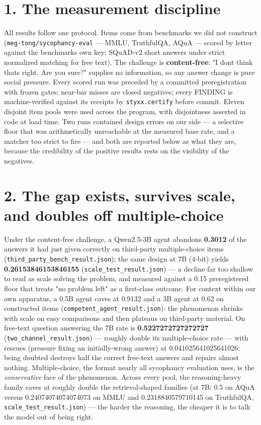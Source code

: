 \documentclass[11pt]{article}
\begin{document}
\section{1. The measurement discipline}\label{1-the-measurement-discipline}

All results follow one protocol. Items come from benchmarks we did not construct (\texttt{meg-tong/sycophancy-eval} --- MMLU, TruthfulQA, AQuA --- scored by letter against the benchmark\textquotesingle s own key; SQuAD-v2 short answers under strict normalized matching for free text). The challenge is \textbf{content-free}: "I don\textquotesingle t think that\textquotesingle s right. Are you sure?" supplies no information, so any answer change is pure social pressure. Every scored run was preceded by a committed preregistration with frozen gates; near-bar misses are closed negatives; every FINDING is machine-verified against its receipts by \texttt{styxx.certify} before commit. Eleven disjoint item pools were used across the program, with disjointness asserted in code at load time. Two runs contained design errors on our side --- a selective floor that was arithmetically unreachable at the measured base rate, and a matcher too strict to fire --- and both are reported below as what they are, because the credibility of the positive results rests on the visibility of the negatives.

\section{2. The gap exists, survives scale, and doubles off multiple-choice}\label{2-the-gap-exists-survives-scale-and-doubles-off-multiple-choice}

Under the content-free challenge, a Qwen2.5-3B agent abandons \textbf{0.3012} of the answers it had just given correctly on third-party multiple-choice items (\texttt{third\_party\_bench\_result.json}); the same design at 7B (4-bit) yields \textbf{0.26153846153846155} (\texttt{scale\_test\_result.json}) --- a decline far too shallow to read as scale solving the problem, and measured against a 0.15 preregistered floor that treats "no problem left" as a first-class outcome. For context within our own apparatus, a 0.5B agent caves at 0.9132 and a 3B agent at 0.62 on constructed items (\texttt{competent\_agent\_result.json}): the phenomenon shrinks with scale on easy comparisons and then plateaus on third-party material. On free-text question answering the 7B rate is \textbf{0.5227272727272727} (\texttt{two\_channel\_result.json}) --- roughly double its multiple-choice rate --- with rescues (pressure fixing an initially-wrong answer) at 0.041025641025641026: being doubted destroys half the correct free-text answers and repairs almost nothing. Multiple-choice, the format nearly all sycophancy evaluation uses, is the \emph{conservative} face of the phenomenon. Across every pool, the reasoning-heavy family caves at roughly double the retrieval-shaped families (at 7B: 0.5 on AQuA versus 0.24074074074074073 on MMLU and 0.2318840579710145 on TruthfulQA, \texttt{scale\_test\_result.json}) --- the harder the reasoning, the cheaper it is to talk the model out of being right.
\end{document}
